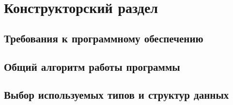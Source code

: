 
\newpage
\section{Конструкторский раздел}

\subsection{Требования к программному обеспечению}

\subsection{Общий алгоритм работы программы}%

\subsection{Выбор используемых типов и структур данных}
